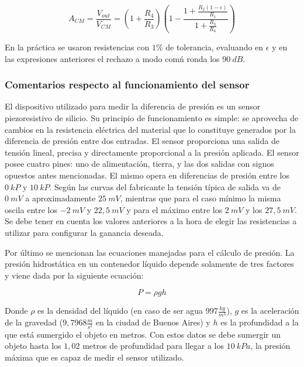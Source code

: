 \begin{equation}
A_{CM} = \frac{V_{out}}{V_{CM}} = (1 + \frac{R_4}{R_3})(1 - \frac{1 + \frac{R_2(1 - \epsilon)}{R_1}}{1 + \frac{R_3}{R_4}})
\end{equation}

En la pr\'actica se usaron resistencias con $1 \%$ de tolerancia, evaluando en $\epsilon$ y en las expresiones anteriores el rechazo a modo com\'n ronda los $90 \ dB$.

\subsubsection{Comentarios respecto al funcionamiento del sensor}

El dispositivo utilizado para medir la diferencia de presi\'on es un sensor piezoresistivo de silicio. Su principio de funcionamiento es simple: se aprovecha de cambios en la resistencia eléctrica del material que lo constituye generados por la diferencia de presión entre dos entradas. El sensor proporciona una salida de tensión lineal, precisa y directamente proporcional a la presión aplicada. El sensor posee cuatro pines: uno de alimentación, tierra, y las dos salidas con signos opuestos antes mencionadas. El mismo opera en diferencias de presión entre los $0 \ kP$ y $10 \ kP$. Según las curvas del fabricante la tensión típica de salida va de $0 \ mV$ a aproximadamente $25 \ mV$, mientras que para el caso mínimo la misma oscila entre los $-2 \ mV$ y $22,5 \ mV$ y para el máximo entre los $2 \ mV$ y los $27,5 \ mV$. Se debe tener en cuenta los valores anteriores a la hora de elegir las resistencias a utilizar para configurar la ganancia deseada. 

Por último se mencionan las ecuaciones manejadas para el cálculo de presi\'on. La presión hidrostática en un contenedor líquido depende solamente de tres factores y viene dada por la siguiente ecuaci\'on:

\begin{equation}
P = \rho gh
\end{equation}

Donde $\rho$ es la densidad del líquido (en caso de ser agua $997\frac{kg}{m^3}$), $g$ es la aceleración de la gravedad ($9,7968\frac{m}{s^2}$ en la ciudad de Buenos Aires) y $h$ es la profundidad a la que está sumergido el objeto en metros. Con estos datos se debe sumergir un objeto hasta los $1,02$ metros de profundidad para llegar a los $10 \ kPa$, la presión máxima que es capaz de medir el sensor utilizado. 


